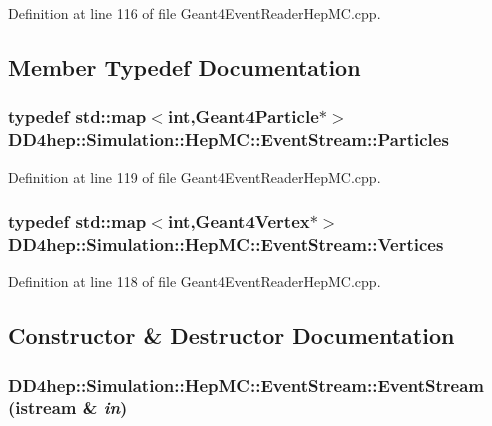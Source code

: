Definition at line 116 of file Geant4EventReaderHepMC.cpp.

\subsection{Member Typedef Documentation}
\hypertarget{class_d_d4hep_1_1_simulation_1_1_hep_m_c_1_1_event_stream_a99e0260f816229d8ab3ebdd5487b3af1}{
\subsubsection[{Particles}]{\setlength{\rightskip}{0pt plus 5cm}typedef std::map$<$int,{\bf Geant4Particle}$\ast$$>$ {\bf DD4hep::Simulation::HepMC::EventStream::Particles}}}
\label{class_d_d4hep_1_1_simulation_1_1_hep_m_c_1_1_event_stream_a99e0260f816229d8ab3ebdd5487b3af1}


Definition at line 119 of file Geant4EventReaderHepMC.cpp.\hypertarget{class_d_d4hep_1_1_simulation_1_1_hep_m_c_1_1_event_stream_a3e270d38edde8369e52ad396615a2755}{
\subsubsection[{Vertices}]{\setlength{\rightskip}{0pt plus 5cm}typedef std::map$<$int,{\bf Geant4Vertex}$\ast$$>$ {\bf DD4hep::Simulation::HepMC::EventStream::Vertices}}}
\label{class_d_d4hep_1_1_simulation_1_1_hep_m_c_1_1_event_stream_a3e270d38edde8369e52ad396615a2755}


Definition at line 118 of file Geant4EventReaderHepMC.cpp.

\subsection{Constructor \& Destructor Documentation}
\hypertarget{class_d_d4hep_1_1_simulation_1_1_hep_m_c_1_1_event_stream_a73b3cc7b9dee4ad7e9e2dcf17a09e896}{
\subsubsection[{EventStream}]{\setlength{\rightskip}{0pt plus 5cm}DD4hep::Simulation::HepMC::EventStream::EventStream (istream \& {\em in})}}
\label{class_d_d4hep_1_1_simulation_1_1_hep_m_c_1_1_event_stream_a73b3cc7b9dee4ad7e9e2dcf17a09e896}


